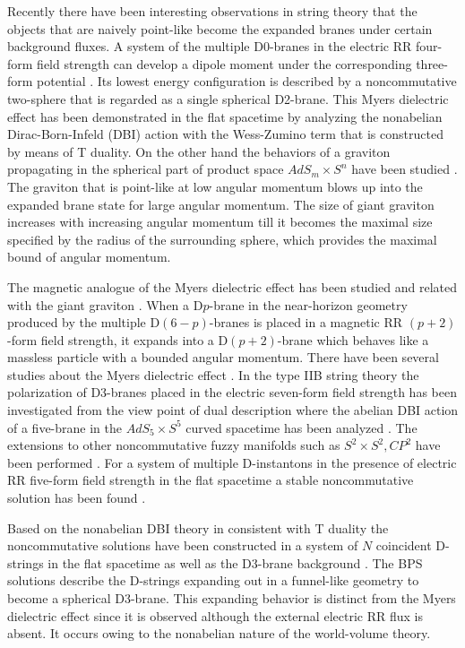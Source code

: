 \documentclass[12pt,a4paper]{article}
\begin{document}
Recently there have been interesting observations in string theory that
the objects that are naively point-like become the expanded branes 
under certain background fluxes. A system of the multiple D0-branes in
the electric RR four-form field strength can develop a dipole moment
under the corresponding three-form potential \cite{RCM,TR}. Its lowest 
energy configuration is described by a noncommutative two-sphere that is
regarded as a single spherical D2-brane.  This Myers dielectric effect 
has been demonstrated in the flat spacetime by analyzing 
the nonabelian Dirac-Born-Infeld (DBI) action with the Wess-Zumino 
term that is constructed by means of T duality.  
On the other hand the behaviors of a graviton propagating in the
spherical part of product space $AdS_m \times S^n$ 
have been studied \cite{MST}.
The graviton that is point-like at low angular momentum blows up into the
expanded brane state for large angular momentum. The size of giant 
graviton increases with increasing angular momentum till it becomes
the maximal size specified by the radius of the surrounding sphere, 
which provides the maximal bound of angular momentum. 

The magnetic analogue of the Myers dielectric effect has been studied and
related with the giant graviton \cite{DTV}.
When a D$p$-brane in the near-horizon geometry produced by the multiple
D$(6-p)$-branes is placed in a magnetic RR $(p+2)$-form field strength,
it expands into a D$(p+2)$-brane which behaves like a massless particle
with a bounded angular momentum. There have been several studies about the
Myers dielectric effect \cite{PS,TV,GJS,IB}.
In the type IIB string theory the polarization
of D3-branes placed in the electric seven-form field strength has been
investigated from the view point of dual description where the 
abelian DBI action of a five-brane in the $AdS_5 \times S^5$ curved 
spacetime has been analyzed \cite{PS}.
The extensions to other noncommutative fuzzy manifolds such as 
$S^2 \times S^2, CP^2$ have been performed \cite{TV}.
For a system of multiple D-instantons in the presence of electric RR
five-form field strength in the flat spacetime a stable noncommutative
solution has been found \cite{GJS}.

Based on the nonabelian DBI theory in consistent with T duality 
the noncommutative solutions have been constructed in a system of $N$
coincident D-strings in the flat spacetime as well as the D3-brane
background \cite{CMT}. The BPS solutions describe 
the D-strings expanding out in
a funnel-like geometry to become a spherical D3-brane. 
This expanding behavior is distinct from the Myers dielectric effect
since it is observed although the external electric RR flux is absent.
It occurs owing to the nonabelian nature of the world-volume theory.
\end{document}
